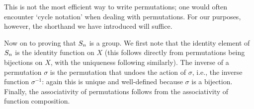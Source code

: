 \begin{example}
    This is not the most efficient way to write permutations; one would often
    encounter `cycle notation' when dealing with permutations. For our purposes,
    however, the shorthand we have introduced will suffice.

    Now on to proving that \(S_{n}\) is a group. We first note that the
    identity element of \(S_{n}\) is the identity function on \(X\) (this
    follows directly from permutations being bijections on \(X\), with the
    uniqueness following similarly). The inverse of a permutation \(\sigma\) is
    the permutation that undoes the action of \(\sigma\), i.e., the inverse
    function \(\sigma^{-1}\): again this is unique and well-defined because
    \(\sigma\) is a bijection. Finally, the associativity of permutations
    follows from the associativity of function composition.
\end{example}

